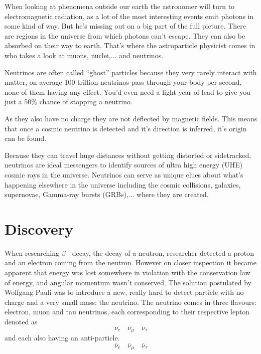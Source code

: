\documentclass[11pt,a4paper,faculty=we,language=en,doctype=report]{cls/ugent-doc}
\begin{document}
When looking at phenomena outside our earth the astronomer will turn to
electromagnetic radiation, as a lot of the most interesting events emit photons
in some kind of way. But he's missing out on a big part of
the full picture.  There are regions in the universe from which photons can't
escape. They can also be absorbed on their way to earth.  That's where the
astroparticle physicist comes in who takes a look at muons, nuclei,... and
neutrinos.

Neutrinos are often called “ghost” particles because they very rarely interact
with matter, on average 100 trillion neutrinos pass through your body per
second, none of them having any effect.  You'd even need a light year of lead
to give you just a 50\% chance of stopping a neutrino.

As they also have no charge they are not deflected by magnetic fields. This means
that once a cosmic neutrino is detected and it's direction is inferred, it's origin
can be found.

Because they can travel huge distances without getting distorted or
sidetracked, neutrinos are ideal messengers to identify sources of ultra high
energy (UHE) cosmic rays in the universe.  Neutrinos can serve as unique clues
about what’s happening elsewhere in the universe including the cosmic
collisions, galaxies, supernovae, Gamma-ray bursts (GRBs),... where they are created.

\section{Discovery}
When researching $\beta^-$ decay, the decay of a neutron, researcher
detected a proton and an electron coming from the neutron. However
on closer inspection it became apparent that energy was lost
somewhere in violation with the conservation law of energy, and
angular momentum wasn't conserved.  The solution postulated by
Wolfgang Pauli was to introduce a new, really hard to detect
particle with no charge and a very small mass: the neutrino.  The neutrino comes in three flavours:
electron, muon and tau neutrinos, each corresponding to their respective lepton denoted as
\begin{equation}
	\nu_e \quad \nu_\mu \quad \nu_\tau
\end{equation}
and each also having an anti-particle.
\begin{equation}
	\bar{\nu}_e \quad \bar{\nu}_\mu \quad \bar{\nu}_\tau
\end{equation}
\end{document}
